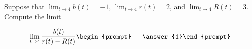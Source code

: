 \documentclass{ximera}
\author{Matthew Carr}
\begin{document}
\begin{exercise}
Suppose that $\displaystyle \lim_{t\to4}b(t)=-1$, $\displaystyle \lim_{t\to4}r(t)=2$, and 
$\displaystyle \lim_{t\to4}R(t)=3$. Compute the limit

\[
\lim_{t\to 4 } \frac{b(t)}{r(t)-R(t)}\begin{prompt} = \answer{1}\end{prompt}
\]
\end{exercise}
\end{document}
